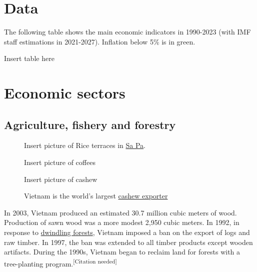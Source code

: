 \documentclass{article}
\begin{document}
\section*{Data}
The following table shows the main economic indicators in 1990-2023 (with IMF staff estimations in 2021-2027). Inflation below 5\% is in green.

\begin{table}[h]
    \centering
    Insert table here    
\end{table}

\section*{Economic sectors}
\subsection*{Agriculture, fishery and forestry}

\begin{figure}
    \begin{framed}
    Insert picture of Rice terraces in \href{https://en.wikipedia.org/wiki/Sa_Pa}{Sa Pa}.
    \caption*{Vietnam is the world's third-largest rice exporter.}
    \end{framed}
    
    \begin{framed}
    Insert picture of coffees
    \caption*{Vietnam is the world's second-largest \href{https://en.wikipedia.org/wiki/Coffee}{coffee} producer and exporter.}
    \end{framed}
    
    \begin{framed}
    Insert picture of cashew
    \caption*{Vietnam is the world's largest \href{https://en.wikipedia.org/wiki/Cashew}{cashew exporter}}    
    \end{framed}
    
\end{figure}


In 2003, Vietnam produced an estimated 30.7 million cubic meters of wood. Production of sawn wood was a more modest 2,950 cubic meters. In 1992, in response to \href{https://en.wikipedia.org/wiki/Deforestation_in_Vietnam}{dwindling forests}, Vietnam imposed a ban on the export of logs and raw timber. In 1997, the ban was extended to all timber products except wooden artifacts. During the 1990s, Vietnam began to reclaim land for forests with a tree-planting program.\textsuperscript{[Citation needed]}
\end{document}
